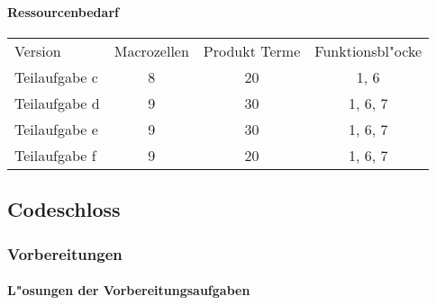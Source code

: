 \documentclass [] {scrartcl}
\begin{document}
  \paragraph{Ressourcenbedarf}
  \begin{table}
    \begin{tabular}{lccc}
      Version & Macrozellen & Produkt Terme & Funktionsbl"ocke\\
      Teilaufgabe c & 8 & 20 & 1, 6\\
      Teilaufgabe d & 9 & 30 & 1, 6, 7\\
      Teilaufgabe e & 9 & 30 & 1, 6, 7\\
      Teilaufgabe f & 9 & 20 & 1, 6, 7\\
    \end{tabular}
  \end{table}

  \subsection{Codeschloss}
  \subsubsection{Vorbereitungen}
  \paragraph{L"osungen der Vorbereitungsaufgaben}
\end{document}
